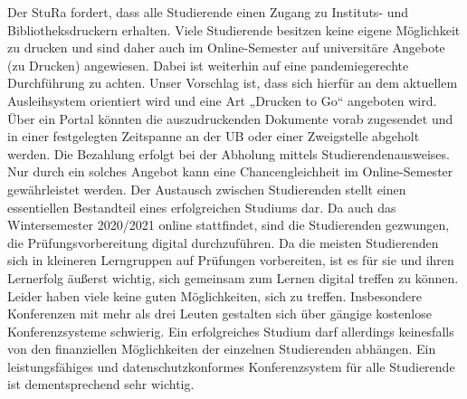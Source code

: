 {        
        Der StuRa fordert, dass alle Studierende einen Zugang zu Instituts- und
        Bibliotheksdruckern
        erhalten. Viele Studierende besitzen keine eigene Möglichkeit zu drucken und sind
        daher auch im
        Online-Semester auf universitäre Angebote (zu Drucken) angewiesen. Dabei ist
        weiterhin auf eine
        pandemiegerechte Durchführung zu achten.
        Unser Vorschlag ist, dass sich hierfür an dem aktuellem Ausleihsystem orientiert wird
        und eine Art
        „Drucken to Go“ angeboten wird. Über ein Portal könnten die auszudruckenden Dokumente
        vorab
        zugesendet und in einer festgelegten Zeitspanne an der UB oder einer Zweigstelle
        abgeholt werden.
        Die Bezahlung erfolgt bei der Abholung mittels Studierendenausweises.
        Nur durch ein solches Angebot kann eine Chancengleichheit im Online-Semester
        gewährleistet
        werden.
        }{
            Der Austausch zwischen Studierenden stellt einen essentiellen Bestandteil eines erfolgreichen Studiums dar. Da auch das Wintersemester 2020/2021 online stattfindet, sind die Studierenden gezwungen, die Prüfungsvorbereitung digital durchzuführen. Da die meisten Studierenden sich in kleineren Lerngruppen auf Prüfungen vorbereiten, ist es für sie und ihren Lernerfolg äußerst wichtig, sich gemeinsam zum Lernen digital treffen zu können. Leider haben viele keine guten Möglichkeiten, sich zu treffen. Insbesondere Konferenzen mit mehr als drei Leuten gestalten sich über gängige kostenlose Konferenzsysteme schwierig. Ein erfolgreiches Studium darf allerdings keinesfalls von den finanziellen Möglichkeiten der einzelnen Studierenden abhängen. Ein leistungsfähiges und datenschutzkonformes Konferenzsystem für alle Studierende ist dementsprechend sehr wichtig.
}

